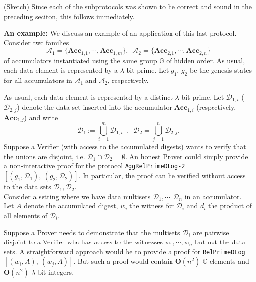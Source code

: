 \documentclass[11pt, lettersize, notitlepage, leqno, footskip=0.6cm]{article}
\newcommand{\Acc}{\mbf{Acc}}
\newcommand{\mc}{\mathcal}
\newcommand{\mb}{\mathbb}
\newcommand{\mbf}{\mathbf}
\newcommand{\lam}{\lambda}
\newcommand{\lamb}{\lambda}
\numberwithin{equation}{section}
\begin{document}
\begin{prf} (Sketch) Since each of the subprotocols was shown to be correct and sound in the preceding seciton, this follows immediately.\end{prf}

\noindent \textbf{An example:} We discuss an example of an application of this last protocol. Consider two families \vspace{-0.1cm}$$\mc{A}_1 = \{\Acc_{1,1},\cdots,\Acc_{1, m}\}, \;\; \mc{A}_2 = \{\Acc_{2,1},\cdots,\Acc_{2, n}\} $$ of accumulators instantiated using the same group $\mb{G}$ of hidden order. As usual, each data element is represented by a $\lam$-bit prime. Let $g_1$, $g_2$ be the genesis states for all accumulators in $\mc{A}_1$ and $\mc{A}_2$, respectively. 

As usual, each data element is represented by a distinct $\lamb$-bit prime. Let $\mc{D}_{1, i}$ ($\mc{D}_{2, j}$) denote the data set inserted into the accumulator $\Acc_{1, i}$ (respectively, $\Acc_{2, j}$) and write $$\mc{D}_1 := \bigcup\limits_{i=1}^m  \mc{D}_{1,i}\;\; ,\;\;\mc{D}_2 = \bigcup\limits_{j=1}^n  \mc{D}_{2,j}.$$ Suppose a Verifier (with access to the accumulated digests) wants to verify that the unions are disjoint, i.e. $\mc{D}_1 \cap \mc{D}_2 = \emptyset.$ An honest Prover could simply provide a non-interactive proof for the protocol \verb|AggRelPrimeDLog-2|$[(g_1, \mc{D}_1) ,\;(g_2, \mc{D}_2)]$. In particular, the proof can be verified without access to the data sets $\mc{D}_{1}, \mc{D}_{2}$. \\


Consider a setting where we have data multisets $\mc{D}_1,\cdots, \mc{D}_n$ in an accumulator. Let $A$ denote the accumulated digest, $w_i$ the witness for $\mc{D}_i$ and $d_i$ the product of all elements of $\mc{D}_i$. 

Suppose a Prover needs to demonstrate that the multisets $\mc{D}_i$ are pairwise disjoint to a Verifier who has access to the witnesses $w_1,\cdots,w_n$ but not the data sets. A straightforward approach would be to provide a proof for \verb|RelPrimeDLog|$[(w_i, A),\;(w_j, A)]$. But such a proof would contain $\mbf{O}(n^2)$ $\mb{G}$-elements and $\mbf{O}(n^2)$ $\lam$-bit integers. 
\end{document}
